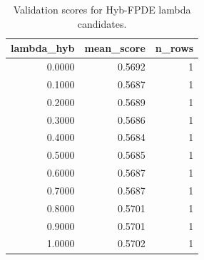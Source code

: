\begin{table}[t]
\caption{Validation scores for Hyb-FPDE lambda candidates.}
\label{tab:lambda_distribution_computed}
\centering
\begin{tabular}{rrr}
\toprule
lambda\_hyb & mean\_score & n\_rows \\
\midrule
0.0000 & 0.5692 & 1 \\
0.1000 & 0.5687 & 1 \\
0.2000 & 0.5689 & 1 \\
0.3000 & 0.5686 & 1 \\
0.4000 & 0.5684 & 1 \\
0.5000 & 0.5685 & 1 \\
0.6000 & 0.5687 & 1 \\
0.7000 & 0.5687 & 1 \\
0.8000 & 0.5701 & 1 \\
0.9000 & 0.5701 & 1 \\
1.0000 & 0.5702 & 1 \\
\bottomrule
\end{tabular}

\end{table}
